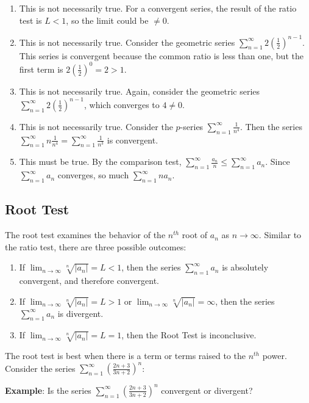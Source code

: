 \begin{Answer}[ref=label2]
\begin{enumerate}
\item This is not necessarily true. For a convergent series, the result of the 
ratio test is $L < 1$, so the limit could be $\neq 0$. 
\item This is not necessarily true. Consider the geometric series $\sum_{n=1}
^\infty 2(\frac{1}{2})^{n-1}$. This series is convergent because the common 
ratio is less than one, but the first term is $2(\frac{1}{2})^0 = 2 > 1$. 
\item This is not necessarily true. Again, consider the geometric series 
$\sum_{n=1}^\infty 2(\frac{1}{2})^{n-1}$, which converges to $4 \neq 0$. 
\item This is not necessarily true. Consider the $p$-series $\sum_{n=1}^
\infty \frac{1}{n^4}$. Then the series $\sum_{n=1}^\infty n \frac{1}{n^4} = 
\sum_{n=1}^\infty \frac{1}{n^3}$ is convergent. 
\item This must be true. By the comparison test, $\sum_{n=1}^\infty 
\frac{a_n}{n} \leq \sum_{n = 1}^\infty a_n$. Since $\sum_{n = 1}^\infty 
a_n$ converges, so much $\sum_{n = 1}^\infty na_n$. 
\end{enumerate}
\end{Answer}

\subsection{Root Test}
The root test examines the behavior of the $n^{th}$ root of $a_n$ as $n \to 
\infty$. Similar to the ratio test, there are three possible outcomes:
\begin{enumerate}
\item If $\lim_{n \to \infty} \sqrt[n]{|a_n|} = L < 1$, then the series $\sum
_{n=1}^\infty a_n$ is absolutely convergent, and therefore convergent.
\item If $\lim_{n \to \infty} \sqrt[n]{|a_n|} = L >1$ or $\lim_{n \to \infty} 
\sqrt[n]{|a_n|} = \infty$, then the series $\sum_{n=1}^\infty a_n$ is 
divergent.
\item If $\lim_{n \to \infty} \sqrt[n]{|a_n|} = L = 1$, then the Root Test is 
inconclusive. 
\end{enumerate}

The root test is best when there is a term or terms raised to the $n^{th}$ 
power. Consider the series $\sum_{n=1}^\infty \left( \frac{2n + 3}{3n + 2} 
\right)^n$:

\textbf{Example}: Is the series $\sum_{n=1}^\infty \left( \frac{2n + 3}{3n + 
2} \right)^n$ convergent or divergent?


